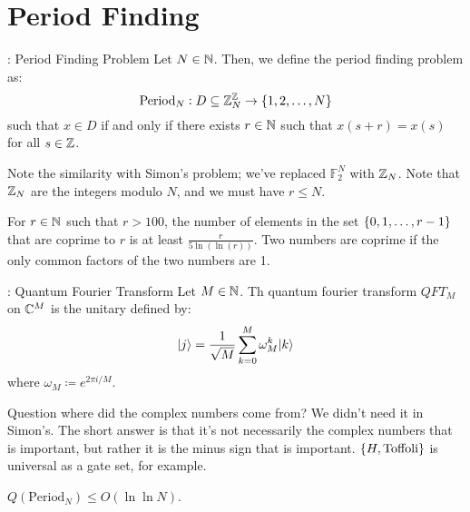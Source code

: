 \section{Period Finding}

\begin{defbox}{: Period Finding Problem}
    Let $N \in \mathbb{N}$. Then, we define the period finding problem as:
    \begin{equation}
        \text{Period}_{N}: D \subseteq \mathbb{Z}_N^{\mathbb{Z}} \to \set{1, 2, \ldots, N}
    \end{equation}
    such that $x \in D$ if and only if there exists $r \in \mathbb{N}$ such that $x(s + r) = x(s)$ for all $s \in \mathbb{Z}$. 
\end{defbox}

Note the similarity with Simon's problem; we've replaced $\mathbb{F}_2^N$ with $\mathbb{Z}_N$. Note that $\mathbb{Z}_N$ are the integers modulo $N$, and we must have $r \leq N$. 

\begin{lembox}{}
    For $r \in \mathbb{N}$ such that $r > 100$, the number of elements in the set $\set{0, 1, \ldots, r-1}$ that are coprime to $r$ is at least $\frac{r}{5\ln(\ln(r))}$. Two numbers are coprime if the only common factors of the two numbers are 1.
\end{lembox}

\begin{defbox}{: Quantum Fourier Transform}
    Let $M \in \mathbb{N}$. Th quantum fourier transform $QFT_M$ on $\mathbb{C}^M$ is the unitary defined by:
    \begin{equation}
        \lvert j \rangle = \frac{1}{\sqrt{M}}\sum_{k=0}^M \omega_M^k\lvert k \rangle
    \end{equation}
    where $\omega_M \coloneqq e^{2\pi i/M}$.
\end{defbox}

Question where did the complex numbers come from? We didn't need it in Simon's. The short answer is that it's not necessarily the complex numbers that is important, but rather it is the minus sign that is important. $\set{H, \text{Toffoli}}$ is universal as a gate set, for example.

\begin{propbox}{}
    $Q(\text{Period}_N) \leq O(\ln\ln N)$.
\end{propbox}


